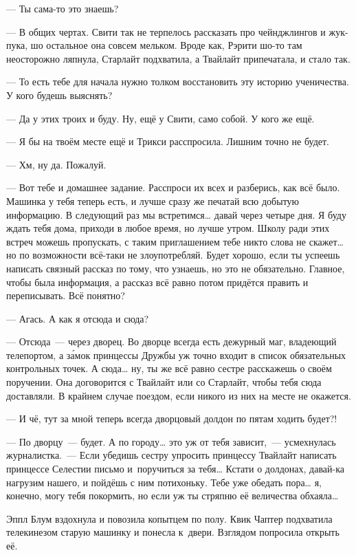 \documentclass[fontsize=11pt,a5paper,titlepage=firstcover]{scrbook}
\begin{document}
--- Ты сама-то это знаешь?

--- В общих чертах. Свити так не терпелось рассказать про чейнджлингов и жук-пука, шо остальное она совсем мельком. Вроде как, Рэрити шо-то там неосторожно ляпнула, Старлайт подхватила, а Твайлайт припечатала, и стало так.

--- То есть тебе для начала нужно толком восстановить эту историю ученичества. У кого будешь выяснять?

--- Да у этих троих и буду. Ну, ещё у Свити, само собой. У кого же ещё.

--- Я бы на твоём месте ещё и Трикси расспросила. Лишним точно не будет.

--- Хм, ну да. Пожалуй.

--- Вот тебе и домашнее задание. Расспроси их всех и разберись, как всё было. Машинка у тебя теперь есть, и лучше сразу же печатай всю добытую информацию. В следующий раз мы встретимся{\ldots} давай через четыре дня. Я буду ждать тебя дома, приходи в любое время, но лучше утром. Школу ради этих встреч можешь пропускать, с таким приглашением тебе никто слова не скажет{\ldots} но по возможности всё-таки не злоупотребляй. Будет хорошо, если ты успеешь написать связный рассказ по тому, что узнаешь, но это не обязательно. Главное, чтобы была информация, а рассказ всё равно потом придётся править и переписывать. Всё понятно?

--- Агась. А как я отсюда и сюда?

--- Отсюда~--- через дворец. Во дворце всегда есть дежурный маг, владеющий телепортом, а за́мок принцессы Дружбы уж точно входит в список обязательных контрольных точек. А сюда{\ldots} ну, ты же всё равно сестре расскажешь о своём поручении. Она договорится с Твайлайт или со Старлайт, чтобы тебя сюда доставляли. В крайнем случае поездом, если никого из них на месте не окажется.

--- И чё, тут за мной теперь всегда дворцовый долдон по пятам ходить будет?!

--- По дворцу~--- будет. А по городу{\ldots} это уж от тебя зависит,~--- усмехнулась журналистка.~--- Если убедишь сестру упросить принцессу Твайлайт написать принцессе Селестии письмо и~поручиться за тебя{\ldots} Кстати о долдонах, давай-ка нагрузим нашего, и пойдёшь с ним потихоньку. Тебе уже обедать пора{\ldots} я, конечно, могу тебя покормить, но если уж ты стряпню её величества обхаяла{\ldots}

Эппл Блум вздохнула и повозила копытцем по полу. Квик Чаптер подхватила телекинезом старую машинку и понесла к~двери. Взглядом попросила открыть её.
\end{document}

